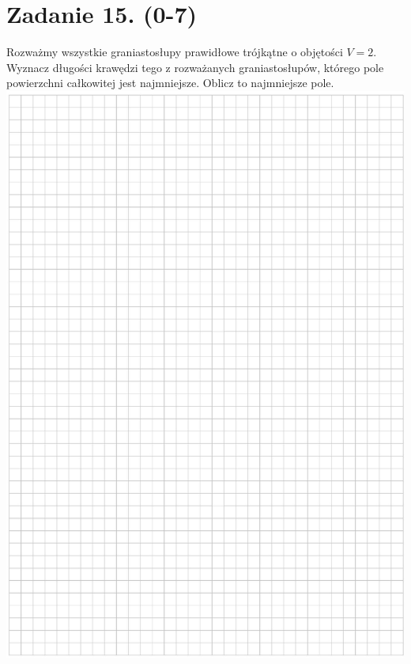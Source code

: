 \documentclass[10pt]{article}
\begin{document}
\section*{Zadanie 15. (0-7)}
Rozważmy wszystkie graniastosłupy prawidłowe trójkątne o objętości \(V=2\). Wyznacz długości krawędzi tego z rozważanych graniastosłupów, którego pole powierzchni całkowitej jest najmniejsze. Oblicz to najmniejsze pole.\\
\includegraphics[max width=\textwidth, center]{2024_11_21_9df891ea1c7ef9791261g-20}\\
\end{document}
